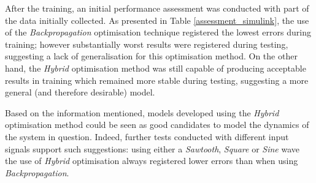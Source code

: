 \documentclass[11pt]{article}
\begin{document}
After the training, an initial performance assessment was conducted with part of the data initially collected. As presented in Table \ref{assessment_simulink}, the use of the \emph{Backpropagation} optimisation technique registered the lowest errors during training; however substantially worst results were registered during testing, suggesting a lack of generalisation for this optimisation method. On the other hand, the \emph{Hybrid} optimisation method was still capable of producing acceptable results in training which remained more stable during testing, suggesting a more general (and therefore desirable) model.

Based on the information mentioned, models developed using the \emph{Hybrid} optimisation method could be seen as good candidates to model the dynamics of the system in question. Indeed, further tests conducted with different input signals support such suggestions: using either a \emph{Sawtooth}, \emph{Square} or \emph{Sine} wave the use of \emph{Hybrid} optimisation always registered lower errors than when using \emph{Backpropagation}.
\end{document}
